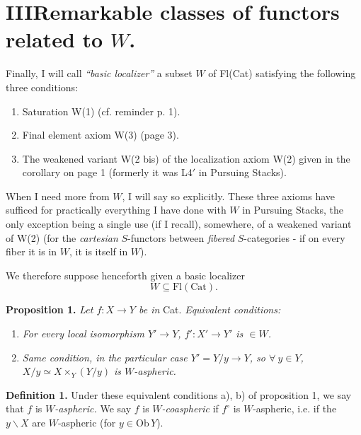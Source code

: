 \documentclass[11pt,leqno]{article}
\newcommand{\printedpage}[1]{\marginpar{\footnotesize p.~#1}}
\newcommand{\msp}[1]{\marginpar{\footnotesize [#1]}}
\newcommand{\Ob}{\mathrm{Ob}\,}
\begin{document}
\printedpage{19}

\section*{III\quad Remarkable classes of functors related to $W$.}

Finally, I will call \textit{``basic localizer''} a subset $W$ of Fl(Cat) satisfying the following three conditions: %

\begin{enumerate}
\item[(i)] Saturation W(1) (cf. reminder p. 1).
\item[(ii)] Final element axiom W(3) (page 3).
\item[(iii)] The weakened variant W(2 bis) of the localization axiom W(2) given in the corollary on page 1 (formerly it was L4$'$ in Pursuing Stacks).
\end{enumerate}

When I need more from $W$, I will say so explicitly. These three axioms have sufficed for practically everything I have done with $W$ in Pursuing Stacks, the only exception being a single use (if I recall), somewhere, of a weakened variant of W(2) (for the \textit{cartesian} $S$-functors between \textit{fibered} $S$-categories - if on every fiber it is in $W$, it is itself in $W$).

We therefore suppose henceforth given a basic localizer
\[
W \subseteq \mathrm{Fl}(\mathrm{Cat}).
\]

\textbf{Proposition 1.} \textit{Let $f : X \longrightarrow Y$ be in} \textup{Cat}. \textit{Equivalent conditions:}

\begin{enumerate}
\item[\textit{a)}] \textit{For every local isomorphism $Y' \longrightarrow Y$, $f' : X' \longrightarrow Y'$ is $\in W$.}
\item[\textit{b)}] \textit{Same condition, in the particular case $Y' = Y/y \longrightarrow Y$, so $\forall\ y \in Y$, $X/y \simeq X \times_Y (Y/y)$ is $W$-aspheric.}
\end{enumerate}

\msp{page 23}\textbf{Definition 1.} Under these equivalent conditions a), b) of proposition 1, we say that $f$ is \textit{$W$-aspheric.} We say $f$ is \textit{$W$-coaspheric} if $f^{\circ}$ is $W$-aspheric, i.e. if the $y\backslash X$ are $W$-aspheric (for $y \in \Ob Y$).
\end{document}
